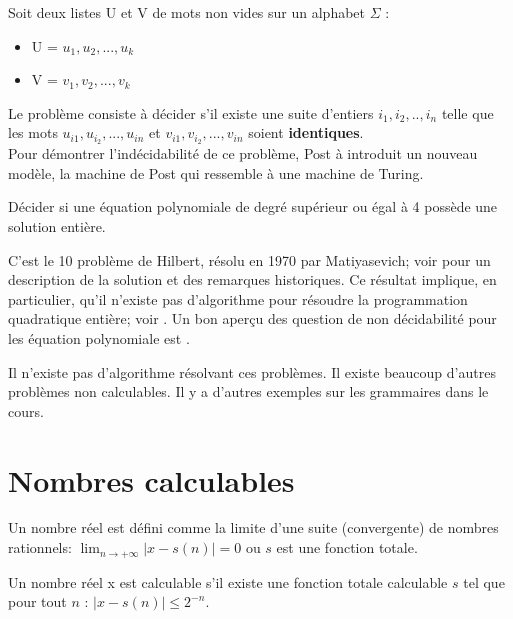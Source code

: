 \begin{mydef} Soit deux listes U et V
	de mots non vides sur un alphabet $\Sigma$ :
	\begin{itemize}
		\item U = ${u_1,u_2,...,u_k}$
		\item V = ${v_1,v_2,...,v_k}$
	\end{itemize}
	Le problème consiste à décider s’il existe une suite d'entiers
	$i_1,i_2,..,i_n$ telle que les mots $u_{i1},u_{i_2},...,u_{in}$ et
	$v_{i1},v_{i_2},...,v_{in}$ soient \textbf{identiques}. \\
	Pour démontrer l'indécidabilité de ce problème, Post à introduit un
	nouveau modèle, la machine de Post qui ressemble à une machine de Turing.
\end{mydef}

\begin{mydef}
  Décider si une équation
  polynomiale de degré supérieur ou égal à 4 possède une solution entière.
\end{mydef}
C'est le 10\ieme{} problème de Hilbert, résolu en 1970 par Matiyasevich;
voir \cite{davis1973hilbert} pour un description de la solution et des remarques historiques.
Ce résultat implique, en particulier, qu'il n'existe pas d'algorithme pour résoudre
la programmation quadratique entière; voir \cite{jeroslow1973there}.
Un bon aperçu des question de non décidabilité pour les équation polynomiale est \cite{koenigsmann2014undecidability}.

Il n'existe pas d'algorithme résolvant ces problèmes. Il existe beaucoup
d'autres problèmes non calculables. Il y a d'autres exemples sur les grammaires dans le cours.

\section{Nombres calculables}
\label{sec:nombres_calculables}

\begin{mydef}
	Un nombre réel est défini comme la limite d'une suite (convergente) de
	nombres rationnels: $\lim_{n \rightarrow +\infty} |x-s(n)| = 0 $ ou $s$ est
	une fonction totale.
\end{mydef}

\begin{mydef}
	Un nombre réel x est calculable s’il existe une fonction totale
	calculable $s$ tel que pour tout $n$  : $|x-s(n)| \leq 2^{-n}$.
\end{mydef}

